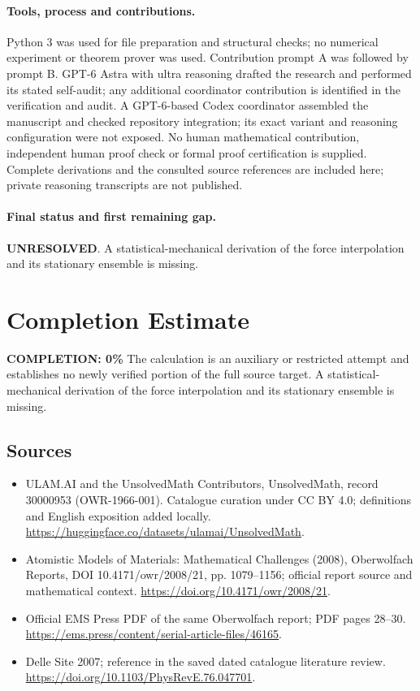 \documentclass[11pt]{article}
\begin{document}
\paragraph{Tools, process and contributions.}
Python 3 was used for file preparation and structural checks; no numerical experiment or theorem prover was used. Contribution prompt A was followed by prompt B. GPT-6 Astra with ultra reasoning drafted the research and performed its stated self-audit; any additional coordinator contribution is identified in the verification and audit. A GPT-6-based Codex coordinator assembled the manuscript and checked repository integration; its exact variant and reasoning configuration were not exposed. No human mathematical contribution, independent human proof check or formal proof certification is supplied. Complete derivations and the consulted source references are included here; private reasoning transcripts are not published.

\paragraph{Final status and first remaining gap.}
\textbf{UNRESOLVED}. A statistical-mechanical derivation of the force interpolation and its stationary ensemble is missing.

\section{Completion Estimate}
\noindent\textbf{COMPLETION: 0\%}
The calculation is an auxiliary or restricted attempt and establishes no newly verified portion of the full source target. A statistical-mechanical derivation of the force interpolation and its stationary ensemble is missing.

\subsection{Sources}
\begin{itemize}
\item[\hypertarget{source:30000953:1}{S1}] ULAM.AI and the UnsolvedMath Contributors, UnsolvedMath, record 30000953 (OWR-1966-001). Catalogue curation under CC BY 4.0; definitions and English exposition added locally.
\url{https://huggingface.co/datasets/ulamai/UnsolvedMath}.
\item[\hypertarget{source:30000953:2}{S2}] Atomistic Models of Materials: Mathematical Challenges (2008), Oberwolfach Reports, DOI 10.4171/owr/2008/21, pp. 1079--1156; official report source and mathematical context.
\url{https://doi.org/10.4171/owr/2008/21}.
\item[\hypertarget{source:30000953:3}{S3}] Official EMS Press PDF of the same Oberwolfach report; PDF pages 28--30.
\url{https://ems.press/content/serial-article-files/46165}.
\item[\hypertarget{source:30000953:4}{S4}] Delle Site 2007; reference in the saved dated catalogue literature review.
\url{https://doi.org/10.1103/PhysRevE.76.047701}.
\end{itemize}
\label{end:30000953}
\end{document}
